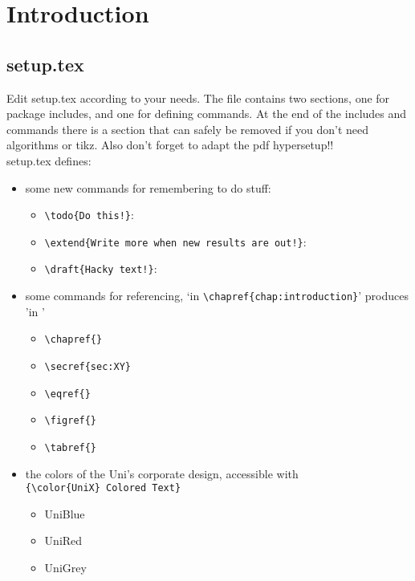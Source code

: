 \chapter{Introduction}\label{chap:introduction}
\section{setup.tex}\label{sec:setup}
Edit setup.tex according to your needs. The file contains two sections, one for package includes, and one for defining commands. At the end of the includes and commands there is a section that can safely be removed if you don't need algorithms or tikz. Also don't forget to adapt the pdf hypersetup!!\\
setup.tex defines:
\begin{itemize}
    \item some new commands for remembering to do stuff:
    \begin{itemize}
        \item \verb|\todo{Do this!}|: 
        \item \verb|\extend{Write more when new results are out!}|:\\ 
        \item \verb|\draft{Hacky text!}|: 
        	\cite{bromley1993siamesesignature}
    \end{itemize}

    \item some commands for referencing, `in \verb|\chapref{chap:introduction}|' produces 'in '
    \begin{itemize}
        \item \verb|\chapref{}|
        \item \verb|\secref{sec:XY}|
        \item \verb|\eqref{}|
        \item \verb|\figref{}|
        \item \verb|\tabref{}|
    \end{itemize}

    \item the colors of the Uni's corporate design, accessible with\\ \verb|{\color{UniX} Colored Text}|
    \begin{itemize}
        \item {\color{UniBlue}UniBlue}
        \item {\color{UniRed}UniRed}
        \item {\color{UniGrey}UniGrey}
    \end{itemize}


\end{itemize}
